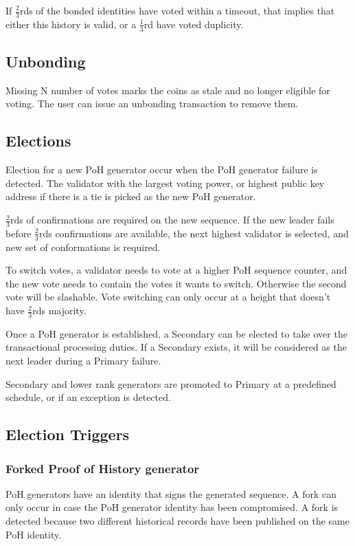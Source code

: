 \documentclass[12pt]{article}
\begin{document}
If \(\frac{2}{3}\)rds of the bonded identities have voted within a timeout, that implies that either this history is valid, or a \(\frac{1}{3}\)rd have voted duplicity.

\subsection{Unbonding}

Missing N number of votes marks the coins as stale and no longer eligible for voting. The user can issue an unbonding transaction to remove them.
\subsection{Elections}\label{subsec:elections}
Election for a new PoH generator occur when the PoH generator failure is detected. The validator with the largest voting power, or highest public key address if there is a tie is picked as the new PoH generator.

\(\frac{2}{3}\)rds of confirmations are required on the new sequence. If the new leader fails before \(\frac{2}{3}\)rds confirmations are available, the next highest validator is selected, and new set of conformations is required.

To switch votes, a validator needs to vote at a higher PoH sequence counter, and the new vote needs to contain the votes it wants to switch. Otherwise the second vote will be slashable. Vote switching can only occur at a height that doesn’t have \(\frac{2}{3}\)rds majority.

Once a PoH generator is established, a Secondary can be elected to take over the transactional processing duties. If a Secondary exists, it will be considered as the next leader during a Primary failure.

Secondary and lower rank generators are promoted to Primary at a predefined schedule, or if an exception is detected.
\subsection{Election Triggers}
\subsubsection{Forked Proof of History generator}

PoH generators have an identity that signs the generated sequence. A fork can only occur in case the PoH generator identity has been compromised. A fork is detected because two different historical records have been published on the same PoH identity.
\end{document}
